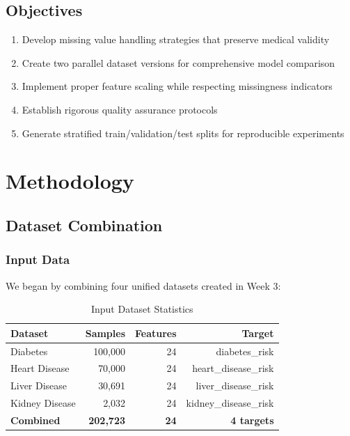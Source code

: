 \documentclass[12pt,a4paper]{article}
\begin{document}
\subsection{Objectives}
\begin{enumerate}[leftmargin=*]
    \item Develop missing value handling strategies that preserve medical validity
    \item Create two parallel dataset versions for comprehensive model comparison
    \item Implement proper feature scaling while respecting missingness indicators
    \item Establish rigorous quality assurance protocols
    \item Generate stratified train/validation/test splits for reproducible experiments
\end{enumerate}

\section{Methodology}

\subsection{Dataset Combination}
\subsubsection{Input Data}
We began by combining four unified datasets created in Week 3:

\begin{table}[H]
\centering
\caption{Input Dataset Statistics}
\begin{tabular}{lrrr}
\toprule
\textbf{Dataset} & \textbf{Samples} & \textbf{Features} & \textbf{Target} \\
\midrule
Diabetes & 100,000 & 24 & diabetes\_risk \\
Heart Disease & 70,000 & 24 & heart\_disease\_risk \\
Liver Disease & 30,691 & 24 & liver\_disease\_risk \\
Kidney Disease & 2,032 & 24 & kidney\_disease\_risk \\
\midrule
\textbf{Combined} & \textbf{202,723} & \textbf{24} & \textbf{4 targets} \\
\bottomrule
\end{tabular}
\end{table}
\end{document}
